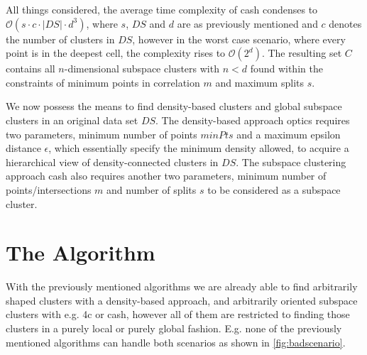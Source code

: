 All things considered, the average time complexity of \gls{cash} condenses to $\mathcal{O}(s \cdot c \cdot |DS| \cdot d^3)$, where $s$, $DS$ and $d$ are as previously mentioned and $c$ denotes the number of clusters in $DS$, however in the worst case scenario, where every point is in the deepest cell, the complexity rises to $\mathcal{O}(2^d)$. The resulting set $C$ contains all $n$-dimensional subspace clusters with $n < d$ found within the constraints of minimum points in correlation $m$ and maximum splits $s$.\\

We now possess the means to find density-based clusters and global subspace clusters in an original data set $DS$. The density-based approach \gls{optics} requires two parameters, minimum number of points $minPts$ and a maximum epsilon distance $\epsilon$, which essentially specify the minimum density allowed, to acquire a hierarchical view of density-connected clusters in $DS$. The subspace clustering approach \gls{cash} also requires another two parameters, minimum number of points/intersections $m$ and number of splits $s$ to be considered as a subspace cluster.

\section{The Algorithm}
With the previously mentioned algorithms we are already able to find arbitrarily shaped clusters with a density-based approach, and arbitrarily oriented subspace clusters with e.g. \gls{4c} or \gls{cash}, however all of them are restricted to finding those clusters in a purely local or purely global fashion. E.g. none of the previously mentioned algorithms can handle both scenarios as shown in \autoref{fig:badscenario}.

